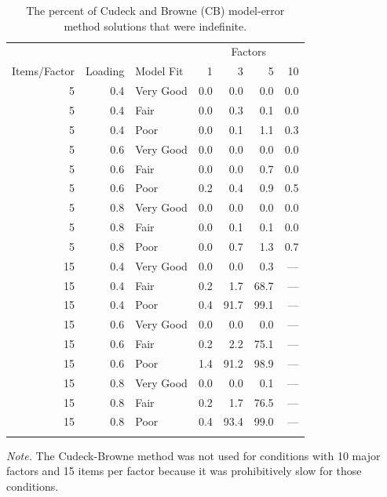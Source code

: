 \documentclass[11pt]{umnthesis}
\begin{document}
\begin{table}[tbp]

\begin{center}
\begin{threeparttable}

\caption{\label{tab:tab-percent-indefinite-matrices}The percent of Cudeck and Browne (CB) model-error method solutions that were indefinite.}

\begin{tabular}{rrlrrrr}
\toprule
 &  &  & \multicolumn{4}{c}{Factors} \\
\cmidrule(r){4-7}
Items/Factor & Loading & Model Fit & 1 & 3 & 5 & 10\\
\midrule
5 & 0.4 & Very Good & 0.0 & 0.0 & 0.0 & 0.0\\
5 & 0.4 & Fair & 0.0 & 0.3 & 0.1 & 0.0\\
5 & 0.4 & Poor & 0.0 & 0.1 & 1.1 & 0.3\\
5 & 0.6 & Very Good & 0.0 & 0.0 & 0.0 & 0.0\\
5 & 0.6 & Fair & 0.0 & 0.0 & 0.7 & 0.0\\
5 & 0.6 & Poor & 0.2 & 0.4 & 0.9 & 0.5\\
5 & 0.8 & Very Good & 0.0 & 0.0 & 0.0 & 0.0\\
5 & 0.8 & Fair & 0.0 & 0.1 & 0.1 & 0.0\\
5 & 0.8 & Poor & 0.0 & 0.7 & 1.3 & 0.7\\
15 & 0.4 & Very Good & 0.0 & 0.0 & 0.3 & ---\\
15 & 0.4 & Fair & 0.2 & 1.7 & 68.7 & ---\\
15 & 0.4 & Poor & 0.4 & 91.7 & 99.1 & ---\\
15 & 0.6 & Very Good & 0.0 & 0.0 & 0.0 & ---\\
15 & 0.6 & Fair & 0.2 & 2.2 & 75.1 & ---\\
15 & 0.6 & Poor & 1.4 & 91.2 & 98.9 & ---\\
15 & 0.8 & Very Good & 0.0 & 0.0 & 0.1 & ---\\
15 & 0.8 & Fair & 0.2 & 1.7 & 76.5 & ---\\
15 & 0.8 & Poor & 0.4 & 93.4 & 99.0 & ---\\
\bottomrule
\addlinespace
\end{tabular}

\begin{tablenotes}[para]
\normalsize{\textit{Note.} The Cudeck-Browne method was not used for conditions with 10 major factors and 15 items per factor because it was prohibitively slow for those conditions.}
\end{tablenotes}

\end{threeparttable}
\end{center}

\end{table}
\end{document}
